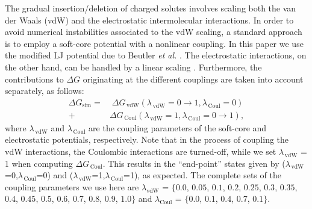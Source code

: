 \documentclass[3p,twocolumn]{elsarticle}
\begin{document}
The gradual insertion/deletion of charged solutes involves scaling both the van der Waals (vdW) and the electrostatic intermolecular interactions.
In order to avoid numerical instabilities associated to the vdW scaling, a standard approach is to employ a soft-core potential with a nonlinear coupling.
In this paper we use the modified LJ potential due to Beutler \textit{et al.} \cite{Beutler_1994}.
The electrostatic interactions, on the other hand, can be handled by a linear scaling \cite{Naden_2015}.
Furthermore, the contributions to $\Delta G$ originating at the different couplings are taken into account separately, as follows:
\begin{equation}
\begin{split}
\Delta G_\text{sim} =& \; \Delta G_{\,\text{vdW}} (\lambda_{\,\text{vdW}} = 0\rightarrow  1, \lambda_{\, \text{Coul}} = 0) \\
+ \; &\Delta G_{\,\text{Coul}} (\lambda_{\, \text{vdW}} = 1,\lambda_{\,\text{Coul}} = 0 \rightarrow 1),
\end{split}
\end{equation}
where $\lambda_{\,\text{vdW}}$ and $\lambda_{\,\text{Coul}}$ are the coupling parameters of the soft-core and electrostatic potentials, respectively.
Note that in the process of coupling the vdW interactions, the Coulombic interactions are turned-off, while we set $\lambda_{\,\text{vdW}}$ = 1 when computing $\Delta G_{\,\text{Coul}}$.
This results in the ``end-point'' states given by ($\lambda_{\,\text{vdW}}$=0,$\lambda_{\,\text{Coul}}$=0) and ($\lambda_{\,\text{vdW}}$=1,$\lambda_{\,\text{Coul}}$=1), as expected.
The complete sets of the coupling parameters we use here are $\lambda_{\text{vdW}}$ = $\{0.0$, $0.05$, $0.1$, $0.2$, $0.25$, $0.3$, $0.35$, $0.4$, $0.45$, $0.5$, $0.6$, $0.7$, $0.8$, $0.9$, $1.0\}$ and $\lambda_{\text{Coul}}$ = $\{0.0$, $0.1$, $0.4$, $0.7$, $0.1\}$.
\end{document}
